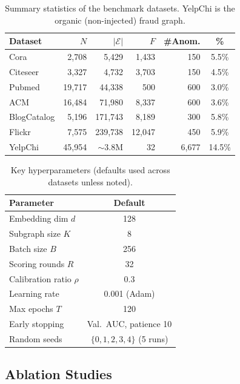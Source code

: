 \documentclass[a4paper]{cas-dc}
\theoremstyle{definition}
\begin{document}
\begin{table}[pos=t]
\centering
\caption{Summary statistics of the benchmark datasets. YelpChi is the organic (non-injected) fraud graph.}
\label{tab:datasets}
\footnotesize
\setlength{\tabcolsep}{3pt}
\begin{tabular}{@{}lrrrrc@{}}
\toprule
\textbf{Dataset} & $N$ & $|\mathcal{E}|$ & $F$ & \textbf{\#Anom.} & \textbf{\%} \\
\midrule
Cora & 2,708 & 5,429 & 1,433 & 150 & 5.5\% \\
Citeseer & 3,327 & 4,732 & 3,703 & 150 & 4.5\% \\
Pubmed & 19,717 & 44,338 & 500 & 600 & 3.0\% \\
ACM & 16,484 & 71,980 & 8,337 & 600 & 3.6\% \\
BlogCatalog & 5,196 & 171,743 & 8,189 & 300 & 5.8\% \\
Flickr & 7,575 & 239,738 & 12,047 & 450 & 5.9\% \\
YelpChi & 45,954 & $\sim$3.8M & 32 & 6,677 & 14.5\% \\
\bottomrule
\end{tabular}
\end{table}

\begin{table}[pos=t]
\centering
\caption{Key hyperparameters (defaults used across datasets unless noted).}
\label{tab:hyperparams}
\footnotesize
\begin{tabular}{lc}
\toprule
\textbf{Parameter} & \textbf{Default} \\
\midrule
Embedding dim $d$ & 128 \\
Subgraph size $K$ & 8 \\
Batch size $B$ & 256 \\
Scoring rounds $R$ & 32 \\
Calibration ratio $\rho$ & 0.3 \\
Learning rate & 0.001 (Adam) \\
Max epochs $T$ & 120 \\
Early stopping & Val.\ AUC, patience 10 \\
Random seeds & $\{0,1,2,3,4\}$ (5 runs) \\
\bottomrule
\end{tabular}
\end{table}

\subsection{Ablation Studies}
\label{sec:ablations}
\end{document}
